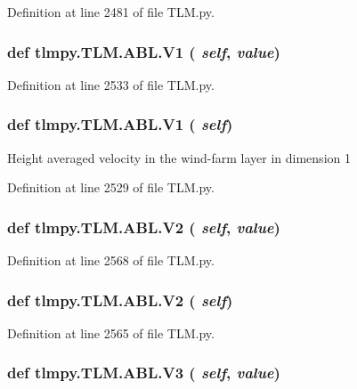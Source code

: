 Definition at line 2481 of file TLM.py.\hypertarget{classtlmpy_1_1TLM_1_1ABL_a27fca54623b8c3178c1598e3ee63ac86}{
\subsubsection[{V1}]{\setlength{\rightskip}{0pt plus 5cm}def tlmpy.TLM.ABL.V1 ( {\em self}, \/   {\em value})}}
\label{classtlmpy_1_1TLM_1_1ABL_a27fca54623b8c3178c1598e3ee63ac86}


Definition at line 2533 of file TLM.py.\hypertarget{classtlmpy_1_1TLM_1_1ABL_a27fca54623b8c3178c1598e3ee63ac86}{
\subsubsection[{V1}]{\setlength{\rightskip}{0pt plus 5cm}def tlmpy.TLM.ABL.V1 ( {\em self})}}
\label{classtlmpy_1_1TLM_1_1ABL_a27fca54623b8c3178c1598e3ee63ac86}
\begin{DoxyVerb}Height averaged velocity in the wind-farm layer in dimension 1\end{DoxyVerb}
 

Definition at line 2529 of file TLM.py.\hypertarget{classtlmpy_1_1TLM_1_1ABL_a171585b4c06bb11f8c7752ea1e5f8fa1}{
\subsubsection[{V2}]{\setlength{\rightskip}{0pt plus 5cm}def tlmpy.TLM.ABL.V2 ( {\em self}, \/   {\em value})}}
\label{classtlmpy_1_1TLM_1_1ABL_a171585b4c06bb11f8c7752ea1e5f8fa1}


Definition at line 2568 of file TLM.py.\hypertarget{classtlmpy_1_1TLM_1_1ABL_a171585b4c06bb11f8c7752ea1e5f8fa1}{
\subsubsection[{V2}]{\setlength{\rightskip}{0pt plus 5cm}def tlmpy.TLM.ABL.V2 ( {\em self})}}
\label{classtlmpy_1_1TLM_1_1ABL_a171585b4c06bb11f8c7752ea1e5f8fa1}


Definition at line 2565 of file TLM.py.\hypertarget{classtlmpy_1_1TLM_1_1ABL_a471433ca280fe46bffa9320a2777c582}{
\subsubsection[{V3}]{\setlength{\rightskip}{0pt plus 5cm}def tlmpy.TLM.ABL.V3 ( {\em self}, \/   {\em value})}}
\label{classtlmpy_1_1TLM_1_1ABL_a471433ca280fe46bffa9320a2777c582}


